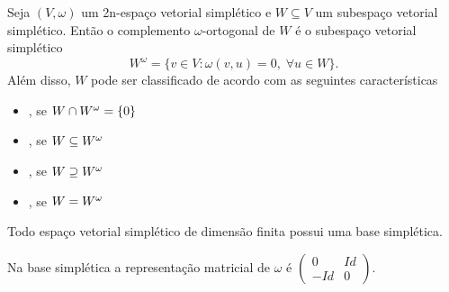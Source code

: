 \documentclass{beamer}
\begin{document}
	\begin{frame}
		\begin{definicao}
			Seja $(V, \omega)$ um 2n-espaço vetorial simplético e $W\subseteq V$ um subespaço vetorial simplético. Então o complemento $\omega$-ortogonal de $W$ é o subespaço vetorial simplético
			$$
			W^{\omega} = \{v\in V: \omega(v,u) = 0,\;\forall u\in W \}.
			$$
			Além disso, $W$ pode ser classificado de acordo com as seguintes características
			\begin{itemize}
				\item {}, se $W\cap W^{\omega} = \{0\}$
				
				\item {}, se $W \subseteq W^{\omega}$
				
				\item {}, se $W\supseteq W^{\omega}$
				
				\item {}, se $W =W^{\omega}$
			\end{itemize}
		\end{definicao}	
		
	\end{frame}
		
	\begin{frame}
		
		\begin{teorema}
			Todo espaço vetorial simplético de dimensão finita possui uma base simplética.
		\end{teorema}
		
		\begin{observacao}
			Na base simplética a representação matricial de $\omega$ é $\left(
			\begin{array}{cc}
			0 & Id
			\\
			-Id & 0
			\end{array}
			\right) $.
		\end{observacao}
	\end{frame}
	
\end{document}
